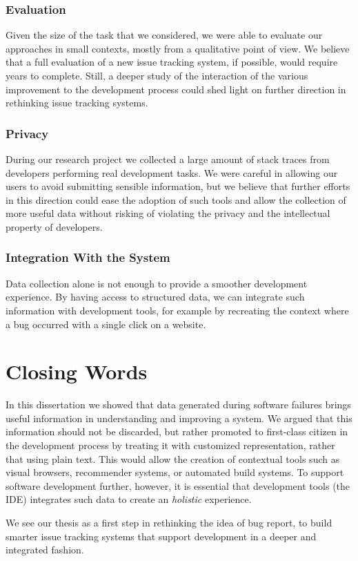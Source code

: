 \subsubsection{Evaluation}

Given the size of the task that we considered, we were able to evaluate our approaches in small contexts, mostly from a qualitative point of view.
We believe that a full evaluation of a new issue tracking system, if possible, would require years to complete.
Still, a deeper study of the interaction of the various improvement to the development process could shed light on further direction in rethinking issue tracking systems.


\subsubsection{Privacy}

During our research project we collected a large amount of stack traces from developers performing real development tasks.
We were careful in allowing our users to avoid submitting sensible information, but we believe that further efforts in this direction could ease the adoption of such tools and allow the collection of more useful data without risking of violating the privacy and the intellectual property of developers.


\subsubsection{Integration With the System}
Data collection alone is not enough to provide a smoother development experience.
By having access to structured data, we can integrate such information with development tools, for example by recreating the context where a bug occurred with a single click on a website.



\section{Closing Words}

In this dissertation we showed that data generated during software failures brings useful information in understanding and improving a system.
We argued that this information should not be discarded, but rather promoted to first-class citizen in the development process by treating it with customized representation, rather that using plain text.
This would allow the creation of contextual tools such as visual browsers, recommender systems, or automated build systems.
To support software development further, however, it is essential that development tools (\ie the IDE) integrates such data to create an \emph{holistic} experience.

We see our thesis as a first step in rethinking the idea of bug report, to build smarter issue tracking systems that support development in a deeper and integrated fashion.

